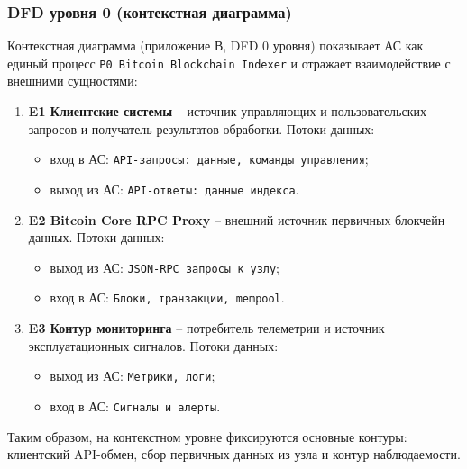 ﻿\documentclass[14pt,a4paper]{extarticle}
\begin{document}
\subsubsection{DFD уровня 0 (контекстная диаграмма)}
\noindent Контекстная диаграмма (приложение В, DFD 0 уровня) показывает АС как единый процесс \texttt{P0 Bitcoin Blockchain Indexer} и отражает взаимодействие с внешними сущностями:
\begin{enumerate}
  \item \textbf{E1 Клиентские системы} -- источник управляющих и пользовательских запросов и получатель результатов обработки.
  Потоки данных:
  \begin{itemize}
    \item вход в АС: \texttt{API-запросы: данные, команды управления};
    \item выход из АС: \texttt{API-ответы: данные индекса}.
  \end{itemize}
  \item \textbf{E2 Bitcoin Core RPC Proxy} -- внешний источник первичных блокчейн данных.
  Потоки данных:
  \begin{itemize}
    \item выход из АС: \texttt{JSON-RPC запросы к узлу};
    \item вход в АС: \texttt{Блоки, транзакции, mempool}.
  \end{itemize}
  \item \textbf{E3 Контур мониторинга} -- потребитель телеметрии и источник эксплуатационных сигналов.
  Потоки данных:
  \begin{itemize}
    \item выход из АС: \texttt{Метрики, логи};
    \item вход в АС: \texttt{Сигналы и алерты}.
  \end{itemize}
\end{enumerate}
\noindent Таким образом, на контекстном уровне фиксируются основные контуры: клиентский API-обмен, сбор первичных данных из узла и контур наблюдаемости.
\end{document}
